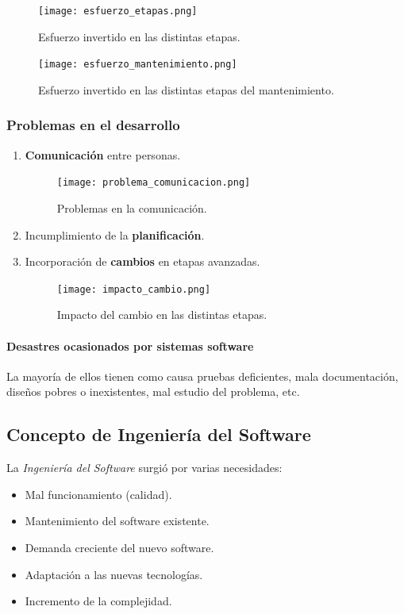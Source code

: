\documentclass[12pt,spanish]{article}
\begin{document}
\begin{figure}[H]
\centering
\texttt{[image: esfuerzo\_etapas.png]}
\caption{Esfuerzo invertido en las distintas etapas.}
\end{figure}

\begin{figure}[H]
\centering
\texttt{[image: esfuerzo\_mantenimiento.png]}
\caption{Esfuerzo invertido en las distintas etapas del mantenimiento.}
\end{figure}

\newpage

\subsubsection{Problemas en el desarrollo}

\begin{enumerate}
	\item \textbf{Comunicación} entre personas.
		\begin{figure}[H]
		\centering
		\texttt{[image: problema\_comunicacion.png]}
		\caption{Problemas en la comunicación.}
		\end{figure}
	\item Incumplimiento de la \textbf{planificación}.
	\item Incorporación de \textbf{cambios} en etapas avanzadas.
		\begin{figure}[H]
		\centering
		\texttt{[image: impacto\_cambio.png]}
		\caption{Impacto del cambio en las distintas etapas.}
		\end{figure}
\end{enumerate}

\paragraph{Desastres ocasionados por sistemas software}
La mayoría de ellos tienen como causa pruebas deficientes, mala documentación, diseños pobres o inexistentes, mal estudio del problema, etc.

\subsection{Concepto de Ingeniería del Software}

La \emph{Ingeniería del Software} surgió por varias necesidades:
\begin{itemize}
	\item Mal funcionamiento (calidad).
	\item Mantenimiento del software existente.
	\item Demanda creciente del nuevo software.
	\item Adaptación a las nuevas tecnologías.
	\item Incremento de la complejidad.
\end{itemize}
\end{document}
